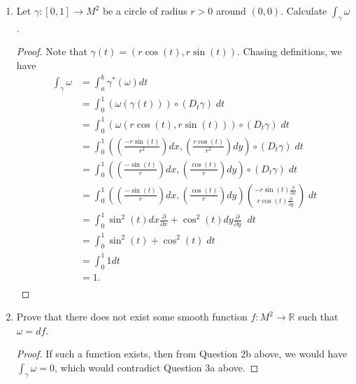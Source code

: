 \documentclass{article}
\begin{document}
\begin{enumerate}[label={\bf Q\arabic*:}]
    \begin{enumerate}
      \item Let $\gamma:[0,1]\rightarrow M^2$ be a circle of radius $r>0$
        around $(0,0)$. Calculate $\int_\gamma\omega$.
        \begin{proof}
          Note that $\gamma(t)=(r\cos(t),r\sin(t))$. Chasing definitions,
          we have
          \begin{align*}
            \int_\gamma\omega &=\int_a^b\gamma^*(\omega)dt \\
              &=\int_0^1(\omega(\gamma(t))) \circ(D_t\gamma)\; dt \\
              &=\int_0^1(\omega(r\cos(t),r\sin(t))) \circ(D_t\gamma)\; dt \\
              &=\int_0^1 \left(\left(\frac{-r\sin(t)}{r^2}\right)dx,
                \left(\frac{r\cos(t)}{r^2}\right)dy\right) \circ(D_t\gamma)\;
                dt \\
              &=\int_0^1 \left(\left(\frac{-\sin(t)}{r}\right)dx,
                \left(\frac{\cos(t)}{r}\right)dy\right) \circ(D_t\gamma)\;
                dt \\
              &=\int_0^1 \left(\left(\frac{-\sin(t)}{r}\right)dx,
                \left(\frac{\cos(t)}{r}\right)dy\right)
                \binom{-r\sin(t)\frac{\partial}{\partial x}}
                {r\cos(t)\frac{\partial}{\partial y}}\; dt \\
              &=\int_0^1 \sin^2(t)dx\frac{\partial}{\partial x} +
                \cos^2(t)dy\frac{\partial}{\partial y}\;\; dt \\
              &=\int_0^1 \sin^2(t)+\cos^2(t)\; dt \\
              &=\int_0^1 1 dt \\
              &=1. \\
          \end{align*}
        \end{proof}

      \item Prove that there does not exist some smooth function
        $f:M^2\rightarrow\mathbb{R}$ such that $\omega=df$.
        \begin{proof}
          If such a function exists, then from Question 2b above, we would
          have $\int_\gamma\omega=0$, which would contradict Question 3a
          above.
        \end{proof}


\end{enumerate}
\end{enumerate}
\end{document}
